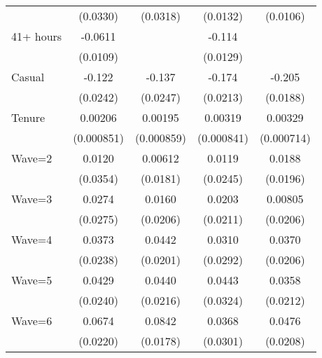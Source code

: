 {\begin{tabular}{l*{4}{c}}
                    &    (0.0330)         &    (0.0318)         &    (0.0132)         &    (0.0106)         \\
[1em]
41+ hours           &     -0.0611\sym{***}&                     &      -0.114\sym{***}&                     \\
                    &    (0.0109)         &                     &    (0.0129)         &                     \\
[1em]
Casual              &      -0.122\sym{***}&      -0.137\sym{***}&      -0.174\sym{***}&      -0.205\sym{***}\\
                    &    (0.0242)         &    (0.0247)         &    (0.0213)         &    (0.0188)         \\
[1em]
Tenure              &     0.00206\sym{*}  &     0.00195\sym{*}  &     0.00319\sym{***}&     0.00329\sym{***}\\
                    &  (0.000851)         &  (0.000859)         &  (0.000841)         &  (0.000714)         \\
[1em]
Wave=2              &      0.0120         &     0.00612         &      0.0119         &      0.0188         \\
                    &    (0.0354)         &    (0.0181)         &    (0.0245)         &    (0.0196)         \\
[1em]
Wave=3              &      0.0274         &      0.0160         &      0.0203         &     0.00805         \\
                    &    (0.0275)         &    (0.0206)         &    (0.0211)         &    (0.0206)         \\
[1em]
Wave=4              &      0.0373         &      0.0442\sym{*}  &      0.0310         &      0.0370         \\
                    &    (0.0238)         &    (0.0201)         &    (0.0292)         &    (0.0206)         \\
[1em]
Wave=5              &      0.0429         &      0.0440\sym{*}  &      0.0443         &      0.0358         \\
                    &    (0.0240)         &    (0.0216)         &    (0.0324)         &    (0.0212)         \\
[1em]
Wave=6              &      0.0674\sym{**} &      0.0842\sym{***}&      0.0368         &      0.0476\sym{*}  \\
                    &    (0.0220)         &    (0.0178)         &    (0.0301)         &    (0.0208)         \\

\end{tabular}}
